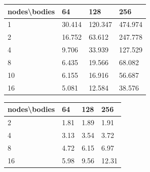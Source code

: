 \documentclass[a4paper]{article}
\begin{document}
\begin{minipage}[b]{.40\textwidth}
  \centering
  \begin{tabular}{l|l|l|l}
  \centering
nodes\textbackslash bodies & 64 & 128 & 256 \\ \hline
1 & 30.414  & 120.347 & 474.974 \\ \hline
2 & 16.752 & 63.612 & 247.778 \\ \hline
4 & 9.706 & 33.939 & 127.529 \\ \hline
8 & 6.435 & 19.566 & 68.082 \\ \hline
10 & 6.155 & 16.916 & 56.687 \\ \hline
16 & 5.081 & 12.584 & 38.576 \\ 
    \hline
  \end{tabular}
  \label{tab:R1_t1}
\end{minipage} \qquad
\begin{minipage}[b]{.40\textwidth}
  \centering
  \begin{tabular}{l|l|l|l}
nodes\textbackslash bodies & 64 & 128 & 256 \\ \hline
2 & 1.81 & 1.89 & 1.91 \\ \hline
4 & 3.13 & 3.54 & 3.72 \\ \hline
8 & 4.72 & 6.15 & 6.97 \\ \hline
16 & 5.98 & 9.56	 & 12.31 \\ 	\hline
  \end{tabular}
  \label{tab:R1_t2}
\end{minipage}
\end{document}
